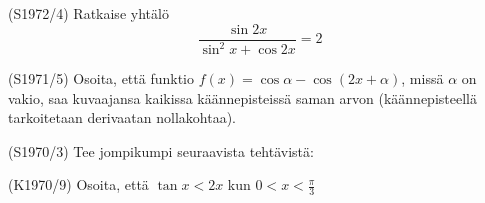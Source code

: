 \begin{tehtava} (S1972/4)
	Ratkaise yhtälö \[\frac{\sin2x}{\sin^2x+\cos2x}=2\]
\end{tehtava}

\begin{tehtava} (S1971/5)
	Osoita, että funktio $f(x)=\cos\alpha-\cos(2x+\alpha)$, missä $\alpha$ on vakio, saa kuvaajansa kaikissa käännepisteissä 
	saman arvon (käännepisteellä tarkoitetaan derivaatan nollakohtaa).
\end{tehtava}

\begin{tehtava} (S1970/3)
	Tee jompikumpi seuraavista tehtävistä:
		\begin{alakohdat}
		\end{alakohdat}
\end{tehtava}

\begin{tehtava} (K1970/9)
	Osoita, että $\tan x<2x$ kun $0<x<\frac{\pi}{3}$
\end{tehtava}







